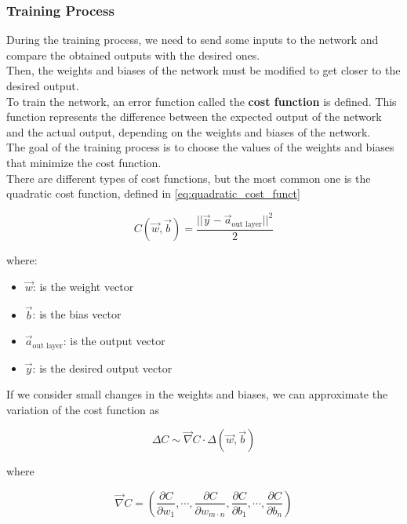 \subsubsection{Training Process}

During the training process, we need to send some inputs to the network and compare the obtained outputs with the desired ones. \\
Then, the weights and biases of the network must be modified to get closer to the desired output. \\
To train the network, an error function called the \textbf{cost function} is defined. This function represents the difference between the expected output of the network and the actual output, depending on the weights and biases of the network. \\
The goal of the training process is to choose the values of the weights and biases that minimize the cost function. \\
There are different types of cost functions, but the most common one is the quadratic cost function, defined in \cref{eq:quadratic_cost_funct}

\begin{equation}
    C(\vec{w},\vec{b}) = \frac{ || \vec{y} - \vec{a}_{\text{out layer}} || ^ 2 }{2}
    \label{eq:quadratic_cost_funct}
\end{equation}

\noindent
where:

\begin{itemize}
    \setlength\itemsep{0pt}
    \setlength\parskip{0pt}
    \item \(\vec{w}\): is the weight vector
    \item \(\vec{b}\): is the bias vector
    \item \(\vec{a}_{\text{out layer}}\): is the output vector
    \item \(\vec{y}\): is the desired output vector
\end{itemize}

\noindent
If we consider small changes in the weights and biases, we can approximate the variation of the cost function as

\[
    \Delta C \sim \vec{\nabla} C \cdot \Delta (\vec{w}, \vec{b})
\]

\noindent
where

\[
    \vec{\nabla} C = \left( \frac{\partial C}{\partial w_1}, \cdots, \frac{\partial C}{\partial w_{m \cdot n}}, \frac{\partial C}{\partial b_1}, \cdots, \frac{\partial C}{\partial b_n} \right)
\]

